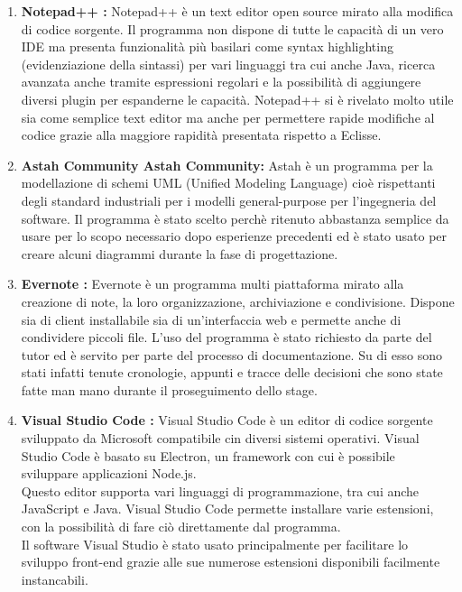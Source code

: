 \begin{enumerate}
\item \textbf{Notepad++ : } Notepad++ è un text editor open source mirato alla modifica di codice sorgente. Il programma non dispone di tutte le capacità di un vero IDE ma presenta funzionalità più basilari come syntax highlighting (evidenziazione della sintassi) per 
vari linguaggi tra cui anche Java, ricerca avanzata anche tramite espressioni regolari e la possibilità di aggiungere diversi plugin per espanderne le capacità.
Notepad++ si è rivelato molto utile sia come semplice text editor ma anche per permettere rapide modifiche al codice grazie alla maggiore rapidità presentata rispetto a Eclisse.

\item \textbf{Astah Community Astah Community: } Astah è un programma per la modellazione di schemi UML (Unified Modeling Language) cioè rispettanti degli standard industriali per i modelli general-purpose per l'ingegneria del software.
Il programma è stato scelto perchè ritenuto abbastanza semplice da usare per lo scopo necessario dopo esperienze precedenti ed è stato usato per creare alcuni diagrammi durante la fase di progettazione.

\item \textbf{Evernote :} Evernote è un programma multi piattaforma mirato alla creazione di note, la loro organizzazione, archiviazione e condivisione. Dispone sia di client installabile sia di un'interfaccia web e permette anche di condividere piccoli file.
L'uso del programma è stato richiesto da parte del tutor ed è servito per parte del processo di documentazione. Su di esso sono stati infatti tenute cronologie, appunti e tracce delle decisioni che sono state fatte man mano durante il proseguimento dello stage.

\item \textbf{Visual Studio Code :}
Visual Studio Code è un editor di codice sorgente sviluppato da Microsoft compatibile cin diversi sistemi operativi.
Visual Studio Code è basato su Electron, un framework con cui è possibile sviluppare applicazioni Node.js.\\
Questo editor supporta vari linguaggi di programmazione, tra cui anche JavaScript e Java.
Visual Studio Code permette installare varie estensioni, con la possibilità di fare ciò direttamente dal programma. \\
Il software Visual Studio è stato usato principalmente per facilitare lo sviluppo front-end grazie alle sue numerose estensioni disponibili facilmente instancabili. 


\end{enumerate}
